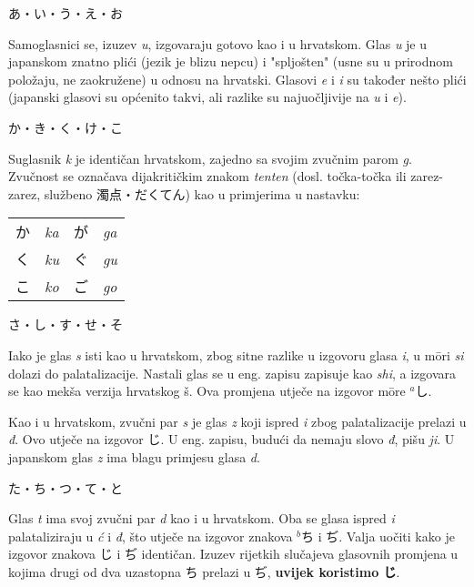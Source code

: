 	
	\noindent\ten あ・い・う・え・お
	
	Samoglasnici se, izuzev \textit{u}, izgovaraju gotovo kao i u hrvatskom. Glas \textit{u} je u japanskom znatno plići (jezik je blizu nepcu) i "spljošten" (usne su u prirodnom položaju, ne zaokružene) u odnosu na hrvatski. Glasovi \textit{e} i \textit{i} su također nešto plići (japanski glasovi su općenito takvi, ali razlike su najuočljivije na \textit{u} i \textit{e}).
	
	\vspace{5pt}
	\noindent\ten か・き・く・け・こ
	
	Suglasnik \textit{k} je identičan hrvatskom, zajedno sa svojim zvučnim parom \textit{g}. Zvučnost se označava dijakritičkim znakom \textit{tenten} (dosl. točka-točka ili zarez-zarez, službeno 濁点・だくてん) kao u primjerima u nastavku:
	
	\begin{tabular}{l l l l}
		か&\textit{ka}&が&\textit{ga}\\
		く&\textit{ku}&ぐ&\textit{gu}\\
		こ&\textit{ko}&ご&\textit{go}\\
	\end{tabular}

	\vspace{5pt}
	\noindent\ten さ・し・す・せ・そ
	
	Iako je glas \textit{s} isti kao u hrvatskom, zbog sitne razlike u izgovoru glasa \textit{i}, u m\={o}ri \textit{si} dolazi do palatalizacije. Nastali glas se u eng. zapisu zapisuje kao \textit{shi}, a izgovara se kao mekša verzija hrvatskog š. Ova promjena utječe na izgovor m\={o}re $^a$し.
	
	Kao i u hrvatskom, zvučni par \textit{s} je glas \textit{z} koji ispred \textit{i} zbog palatalizacije prelazi u \textit{đ}. Ovo utječe na izgovor じ. U eng. zapisu, budući da nemaju slovo \textit{đ}, pišu \textit{ji}. U japanskom glas \textit{z} ima blagu primjesu glasa \textit{d}.
	
	\vspace{5pt}
	\noindent\ten た・ち・つ・て・と
	
	Glas \textit{t} ima svoj zvučni par \textit{d} kao i u hrvatskom. Oba se glasa ispred \textit{i} palataliziraju u \textit{ć} i \textit{đ}, što utječe na izgovor znakova $^b$ち i ぢ. Valja uočiti kako je izgovor znakova じ i ぢ identičan. Izuzev rijetkih slučajeva glasovnih promjena u kojima drugi od dva uzastopna ち prelazi u ぢ, \textbf{uvijek koristimo じ}.
	

